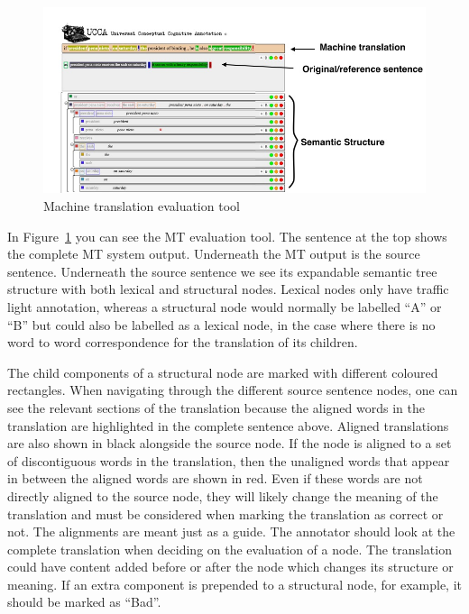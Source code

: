 \documentclass[11pt]{article}
\begin{document}
\begin{figure}[t]
    \includegraphics[width=1\textwidth]{interface-annotations}
    \caption{Machine translation evaluation tool}
    \label{mttool}
\end{figure}

In Figure~\ref{mttool} you can see the MT evaluation tool. The sentence at the top shows the complete MT system output. Underneath the MT output is the  source sentence.  Underneath the source sentence we see its expandable semantic tree structure with both lexical and structural nodes. Lexical nodes only have traffic light annotation, whereas a structural node would normally be labelled ``A'' or ``B'' but could also be labelled as a lexical node, in the case where there is no word to word correspondence for the translation of its children.

 The child components of a structural node are marked with different coloured rectangles. When navigating through the different source sentence nodes, one can see the relevant sections of the translation because the aligned words in the translation are highlighted in the complete sentence above. Aligned translations are also shown in black alongside the source node. If the node is aligned to a set of discontiguous words in the translation, then the unaligned words that appear in between the aligned words are shown in red. Even if these words are not directly aligned to the source node, they 
will likely change the meaning of the translation and must be considered when marking 
the translation as correct or not. The alignments are meant just as a guide. The annotator should  look at the complete translation when deciding on the evaluation of a node. The translation could have content added before or after the node which changes its
 structure or meaning. If an extra component is prepended to a structural node, for example, it should be marked as ``Bad''.
\end{document}
